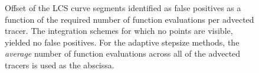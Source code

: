 \begin{figure}[htpb]
    \centering
    
    \caption[Offset of the LCS curve segments identified as false positives,
    as a function of the required number of function evaluations per advected tracer]
    {Offset of the LCS curve segments identified as false positives as a
        function of the required number of function evaluations per advected tracer. The
        integration schemes for which no points are visible, yielded
        no false positives. For the adaptive stepsize methods, the
        \emph{average} number of function evaluations across all of the advected
    tracers is used as the abscissa.}
    \label{fig:lcs_err_fp_fp}
\end{figure}
